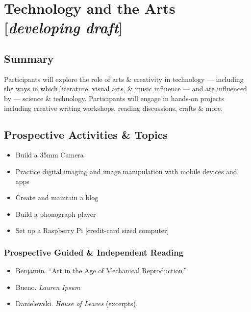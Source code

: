 \documentclass[letterpaper,10pt,english]{sphinxmanual}
\begin{document}
\chapter{Technology and the Arts {[}\emph{developing draft}{]}}
\label{arts::doc}\label{arts:index-0}\label{arts:technology-and-the-arts-developing-draft}

\section{Summary}
\label{arts:summary}
Participants will explore the role of arts \& creativity in technology — including the ways in which literature, visual arts, \& music influence — and are influenced by — science \& technology. Participants will engage in hands-on projects including creative writing workshops, reading discussions, crafts \& more.


\section{Prospective Activities \& Topics}
\label{arts:prospective-activities-topics}\begin{itemize}
\item {} 
Build a 35mm Camera

\item {} 
Practice digital imaging and image manipulation with mobile devices and apps

\item {} 
Create and maintain a blog

\item {} 
Build a phonograph player

\item {} 
Set up a Raspberry Pi {[}credit-card sized computer{]}

\end{itemize}


\subsection{Prospective Guided \& Independent Reading}
\label{arts:prospective-guided-independent-reading}\begin{itemize}
\item {} 
Benjamin. ``Art in the Age of Mechanical Reproduction.''

\item {} 
Bueno. \emph{Lauren Ipsum}

\item {} 
Danielewski. \emph{House of Leaves} (excerpts).

\end{itemize}
\end{document}
